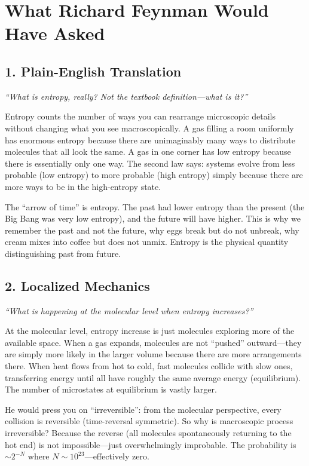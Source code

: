 \documentclass[11pt,openright]{book}
\begin{document}
\section*{What Richard Feynman Would Have Asked}

\subsection*{1. Plain-English Translation}
\textit{``What is entropy, really? Not the textbook definition---what is it?''}

Entropy counts the number of ways you can rearrange microscopic details without changing what you see macroscopically. A gas filling a room uniformly has enormous entropy because there are unimaginably many ways to distribute molecules that all look the same. A gas in one corner has low entropy because there is essentially only one way. The second law says: systems evolve from less probable (low entropy) to more probable (high entropy) simply because there are more ways to be in the high-entropy state.

The ``arrow of time'' is entropy. The past had lower entropy than the present (the Big Bang was very low entropy), and the future will have higher. This is why we remember the past and not the future, why eggs break but do not unbreak, why cream mixes into coffee but does not unmix. Entropy is the physical quantity distinguishing past from future.

\subsection*{2. Localized Mechanics}
\textit{``What is happening at the molecular level when entropy increases?''}

At the molecular level, entropy increase is just molecules exploring more of the available space. When a gas expands, molecules are not ``pushed'' outward---they are simply more likely in the larger volume because there are more arrangements there. When heat flows from hot to cold, fast molecules collide with slow ones, transferring energy until all have roughly the same average energy (equilibrium). The number of microstates at equilibrium is vastly larger.

He would press you on ``irreversible'': from the molecular perspective, every collision is reversible (time-reversal symmetric). So why is macroscopic process irreversible? Because the reverse (all molecules spontaneously returning to the hot end) is not impossible---just overwhelmingly improbable. The probability is $\sim 2^{-N}$ where $N \sim 10^{23}$---effectively zero.
\end{document}
